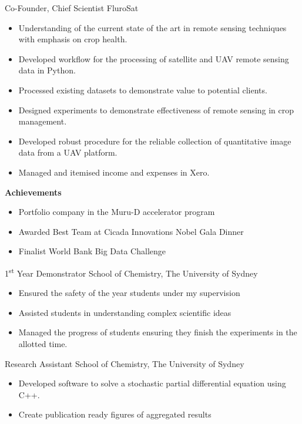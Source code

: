 {Co-Founder, Chief Scientist}
{FluroSat}{}{}
{%
  \begin{itemize}
    \item Understanding of the current state of the art in remote sensing techniques with emphasis on crop health.
    \item Developed workflow for the processing of satellite and UAV remote sensing data in Python.
    \item Processed existing datasets to demonstrate value to potential clients.
    \item Designed experiments to demonstrate effectiveness of remote sensing in crop management.
    \item Developed robust procedure for the reliable collection of quantitative image data from a UAV platform.
    \item Managed and itemised income and expenses in Xero.
  \end{itemize}
  \textbf{Achievements}
  \begin{itemize}
    \item Portfolio company in the Muru-D accelerator program
    \item Awarded Best Team at Cicada Innovations Nobel Gala Dinner
    \item Finalist World Bank Big Data Challenge
  \end{itemize}
}
\vspace{1em}

{1\textsuperscript{st} Year Demonstrator}
{School of Chemistry, The University of Sydney}
{}{}
{%
  \begin{itemize}
    \item Ensured the safety of the  year students under my supervision
    \item Assisted students in understanding complex scientific ideas
    \item Managed the progress of students ensuring they finish the experiments in the allotted time.
  \end{itemize}
}
\vspace{1em}

{Research Assistant}
{School of Chemistry, The University of Sydney}
{}{}{%
  \begin{itemize}
    \item Developed software to solve a stochastic partial differential equation using C++.
    \item Create publication ready figures of aggregated results
  \end{itemize}
}
\vspace{1em}

